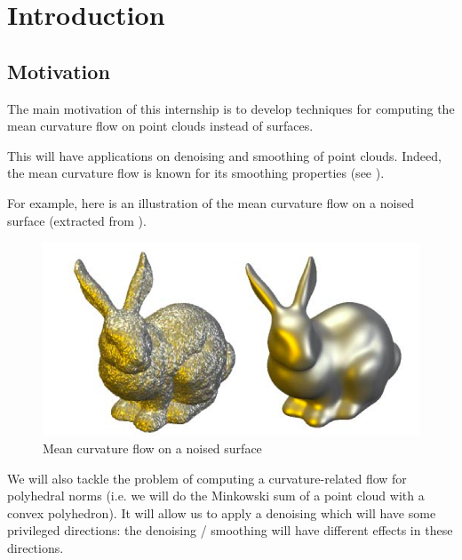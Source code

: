 



\chapter{Introduction}


\section{Motivation}

The main motivation of this internship is to develop techniques for computing the
mean curvature flow on point clouds instead of surfaces.

This will have applications on denoising and smoothing of point clouds. Indeed,
the mean curvature flow is known for its smoothing properties (see
\cite{ciomaga2010level}).

For example, here is an illustration of the mean curvature flow on a noised
surface (extracted from \cite{clarenz2000anisotropic}).

\begin{figure}[H]
    \centering
    \includegraphics[scale=0.3]{img/mean-curvature-flow-rabbit}
    \caption{Mean curvature flow on a noised surface}
\end{figure}

We will also tackle the problem of computing a curvature-related flow for
polyhedral norms (i.e. we will do the Minkowski sum of a point cloud with a
convex polyhedron). It will allow us to apply a denoising which will have some
privileged directions: the denoising / smoothing will have different effects in
these directions.


